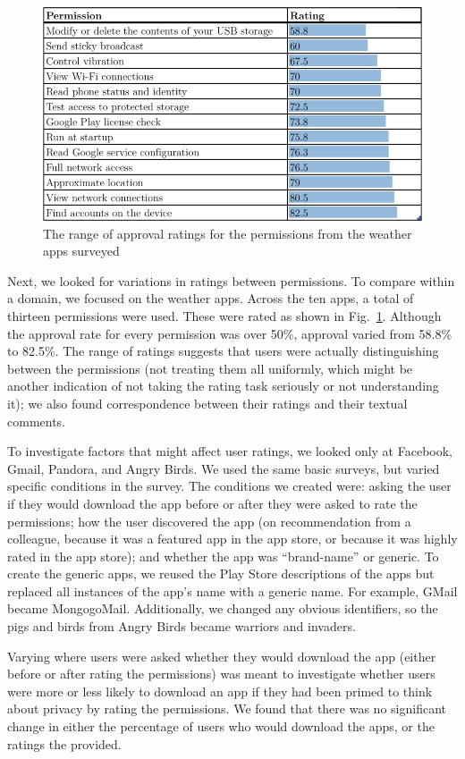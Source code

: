 \documentclass[11pt]{article}
\begin{document}
\begin{figure}[t]
\centering
    \includegraphics[width=.6\linewidth]{img/RatingTable.png}
    \vspace{1pt}
    \caption{The range of approval ratings for the permissions from the 
    weather apps surveyed}
    \label{weatherratings}
\end{figure}

Next, we looked for variations in ratings between permissions. To
compare within a domain, we focused on the weather apps. Across the
ten apps, a total of thirteen permissions were used. These were rated
as shown in Fig.~\ref{weatherratings}.  Although the approval rate for
every permission was over 50\%, approval varied from 58.8\% to
82.5\%. The range of ratings suggests that users were actually
distinguishing between the permissions (not treating them all
uniformly, which might be another indication of not taking the rating
task seriously or not understanding it); we also found correspondence
between their ratings and their textual comments.

To investigate factors that might affect user ratings, we looked only at Facebook, Gmail,
Pandora, and Angry Birds.  We used the same basic surveys, but
varied specific conditions in the survey. The conditions we created
were: asking the user if they would download the app before or after
they were asked to rate the permissions; how the user discovered the
app (on recommendation from a colleague, because it was a featured app in
the app store, or because it was highly rated in the app store); and
whether the app was ``brand-name'' or generic. To create the generic
apps, we reused the Play Store descriptions of the apps but replaced all
instances of the app's name with a generic name. For example, GMail
became MongogoMail.  Additionally, we changed any obvious identifiers,
so the pigs and birds from Angry Birds became warriors and invaders.

Varying where users were asked whether they would download the app 
(either before or after rating the permissions) was
meant to investigate whether users were more or less likely to
download an app if they had been primed to think about privacy by
rating the permissions. We found that there was no significant change
in either the percentage of users who would download the apps, or the
ratings the provided.
\end{document}
